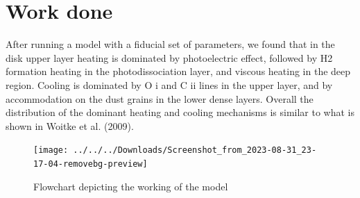 \chapter{Work done}
After running a model with a fiducial set of parameters, we found that in the disk upper layer heating is dominated by photoelectric effect, followed by H2 formation heating in the photodissociation layer, and viscous heating in the deep region. Cooling is dominated by O i and C ii lines in the upper layer, and by accommodation on the dust grains in the lower dense layers. Overall the distribution of the dominant heating and cooling mechanisms is similar to what is shown in Woitke et al. (2009).
\begin{figure}[h]
	\centering
	\texttt{[image: ../../../Downloads/Screenshot\_from\_2023-08-31\_23-17-04-removebg-preview]}
	\caption{Flowchart depicting the working of the model}
	\label{fig:screenshotfrom2023-08-3123-17-04-removebg-preview}
\end{figure}

